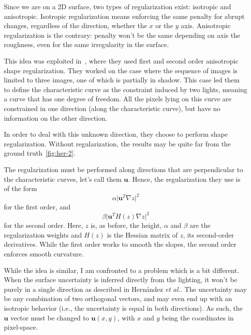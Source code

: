 \documentclass{report}
\begin{document}
Since we are on a 2D surface, two types of regularization exist: isotropic and anisotropic. Isotropic regularization means enforcing the same penalty for abrupt changes, regardless of the direction, whether the $x$ or the $y$ axis. Anisotropic regularization is the contrary: penalty won't be the same depending on axis the roughness, even for the same irregularity in the surface.

This idea was exploited in~\cite{hernandez-pami-11}, where they used first and second order anisotropic shape regularization. They worked on the case where the sequence of images is limited to three images, one of which is partially in shadow. This case led them to define the characteristic curve as the constraint induced by two lights, meaning a curve that has one degree of freedom. All the pixels lying on this curve are constrained in one direction (along the characteristic curve), but have no information on the other direction.

In order to deal with this unknown direction, they choose to perform shape regularization. Without regularization, the results may be quite far from the ground truth~\ref{fig:her-2}. 

The regularization must be performed along directions that are perpendicular to the characteristic curves, let's call them $\mathbf{u}$. Hence, the regularization they use is of the form
\begin{equation}
\alpha \lvert \mathbf{u}^T \nabla z \rvert ^2
\end{equation}
for the first order, and 
\begin{equation}
\beta \lvert \mathbf{u}^T H(z)\nabla z \rvert ^2
\end{equation}
for the second order. Here, $z$ is, as before, the height, $\alpha$ and $\beta$ are the regularization weights and $H(z)$ is the Hessian matrix of $z$, its second-order derivatives. While the first order works to smooth the slopes, the second order enforces smooth curvature.

While the idea is similar, I am confronted to a problem which is a bit different. When the surface uncertainty is inferred directly from the lighting, it won't be purely in a single direction as described in Hernández \emph{et al.}. The uncertainty may be any combination of two orthogonal vectors, and may even end up with an isotropic behavior (i.e., the uncertainty is equal in both directions). As such, the $\mathbf{u}$ vector must be changed to $\mathbf{u}(x,y)$, with $x$ and $y$ being the coordinates in pixel-space.
\end{document}

